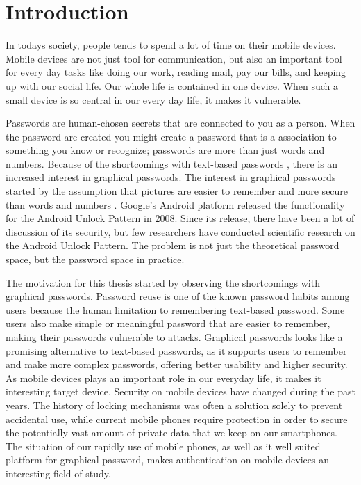 \chapter{Introduction}

  In todays society, people tends to spend a lot of time on their mobile devices. Mobile devices are not just tool for communication, but also an important tool for every day tasks like doing our work, reading mail, pay our bills, and keeping up with our social life. Our whole life is contained in one device. When such a small device is so central in our every day life, it makes it vulnerable.

  Passwords are human-chosen secrets that are connected to you as a person. When the password are created you might create a password that is a association to something you know or recognize; passwords are more than just words and numbers. Because of the shortcomings with text-based passwords \cite{UnixPasswords}, there is an increased interest in graphical passwords. The interest in graphical passwords started by the assumption that pictures are easier to remember and more secure than words and numbers \cite{DeAngeli}. Google's Android platform released the functionality for the Android Unlock Pattern in 2008. Since its release, there have been a lot of discussion of its security, but few researchers have conducted scientific research on the Android Unlock Pattern. The problem is not just the theoretical password space, but the password space in practice. 

  The motivation for this thesis started by observing the shortcomings with graphical passwords. Password reuse is one of the known password habits among users because the human limitation to remembering text-based password. Some users also make simple or meaningful password that are easier to remember, making their passwords vulnerable to attacks. Graphical passwords looks like a promising alternative to text-based passwords, as it supports users to remember and make more complex passwords, offering better usability and higher security. As mobile devices plays an important role in our everyday life, it makes it interesting target device. Security on mobile devices have changed during the past years. The history of locking mechanisms was often a solution solely to prevent accidental use, while current mobile phones require protection in order to secure the potentially vast amount of private data that we keep on our smartphones. The situation of our rapidly use of mobile phones, as well as it well suited platform for graphical password, makes authentication on mobile devices an interesting field of study.

